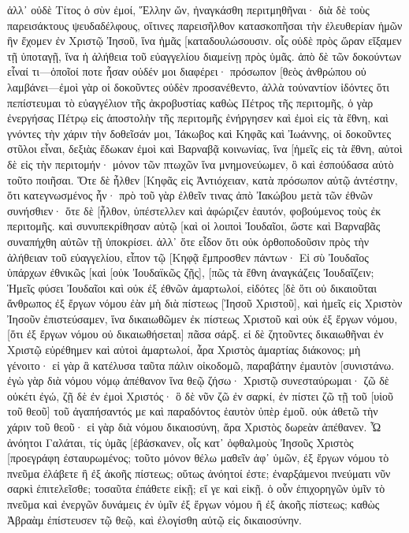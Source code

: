 ἀλλ᾽ οὐδὲ Τίτος ὁ σὺν ἐμοί, Ἕλλην ὤν, ἠναγκάσθη περιτμηθῆναι· 
διὰ δὲ τοὺς παρεισάκτους ψευδαδέλφους, οἵτινες παρεισῆλθον κατασκοπῆσαι τὴν ἐλευθερίαν ἡμῶν ἣν ἔχομεν ἐν Χριστῷ Ἰησοῦ, ἵνα ἡμᾶς [καταδουλώσουσιν. 
οἷς οὐδὲ πρὸς ὥραν εἴξαμεν τῇ ὑποταγῇ, ἵνα ἡ ἀλήθεια τοῦ εὐαγγελίου διαμείνῃ πρὸς ὑμᾶς. 
ἀπὸ δὲ τῶν δοκούντων εἶναί τι—ὁποῖοί ποτε ἦσαν οὐδέν μοι διαφέρει· πρόσωπον [θεὸς ἀνθρώπου οὐ λαμβάνει—ἐμοὶ γὰρ οἱ δοκοῦντες οὐδὲν προσανέθεντο, 
ἀλλὰ τοὐναντίον ἰδόντες ὅτι πεπίστευμαι τὸ εὐαγγέλιον τῆς ἀκροβυστίας καθὼς Πέτρος τῆς περιτομῆς, 
ὁ γὰρ ἐνεργήσας Πέτρῳ εἰς ἀποστολὴν τῆς περιτομῆς ἐνήργησεν καὶ ἐμοὶ εἰς τὰ ἔθνη, 
καὶ γνόντες τὴν χάριν τὴν δοθεῖσάν μοι, Ἰάκωβος καὶ Κηφᾶς καὶ Ἰωάννης, οἱ δοκοῦντες στῦλοι εἶναι, δεξιὰς ἔδωκαν ἐμοὶ καὶ Βαρναβᾷ κοινωνίας, ἵνα [ἡμεῖς εἰς τὰ ἔθνη, αὐτοὶ δὲ εἰς τὴν περιτομήν· 
μόνον τῶν πτωχῶν ἵνα μνημονεύωμεν, ὃ καὶ ἐσπούδασα αὐτὸ τοῦτο ποιῆσαι. 
Ὅτε δὲ ἦλθεν [Κηφᾶς εἰς Ἀντιόχειαν, κατὰ πρόσωπον αὐτῷ ἀντέστην, ὅτι κατεγνωσμένος ἦν· 
πρὸ τοῦ γὰρ ἐλθεῖν τινας ἀπὸ Ἰακώβου μετὰ τῶν ἐθνῶν συνήσθιεν· ὅτε δὲ [ἦλθον, ὑπέστελλεν καὶ ἀφώριζεν ἑαυτόν, φοβούμενος τοὺς ἐκ περιτομῆς. 
καὶ συνυπεκρίθησαν αὐτῷ [καὶ οἱ λοιποὶ Ἰουδαῖοι, ὥστε καὶ Βαρναβᾶς συναπήχθη αὐτῶν τῇ ὑποκρίσει. 
ἀλλ᾽ ὅτε εἶδον ὅτι οὐκ ὀρθοποδοῦσιν πρὸς τὴν ἀλήθειαν τοῦ εὐαγγελίου, εἶπον τῷ [Κηφᾷ ἔμπροσθεν πάντων· Εἰ σὺ Ἰουδαῖος ὑπάρχων ἐθνικῶς [καὶ [οὐκ Ἰουδαϊκῶς ζῇς], [πῶς τὰ ἔθνη ἀναγκάζεις Ἰουδαΐζειν; 
Ἡμεῖς φύσει Ἰουδαῖοι καὶ οὐκ ἐξ ἐθνῶν ἁμαρτωλοί, 
εἰδότες [δὲ ὅτι οὐ δικαιοῦται ἄνθρωπος ἐξ ἔργων νόμου ἐὰν μὴ διὰ πίστεως [Ἰησοῦ Χριστοῦ], καὶ ἡμεῖς εἰς Χριστὸν Ἰησοῦν ἐπιστεύσαμεν, ἵνα δικαιωθῶμεν ἐκ πίστεως Χριστοῦ καὶ οὐκ ἐξ ἔργων νόμου, [ὅτι ἐξ ἔργων νόμου οὐ δικαιωθήσεται] πᾶσα σάρξ. 
εἰ δὲ ζητοῦντες δικαιωθῆναι ἐν Χριστῷ εὑρέθημεν καὶ αὐτοὶ ἁμαρτωλοί, ἆρα Χριστὸς ἁμαρτίας διάκονος; μὴ γένοιτο· 
εἰ γὰρ ἃ κατέλυσα ταῦτα πάλιν οἰκοδομῶ, παραβάτην ἐμαυτὸν [συνιστάνω. 
ἐγὼ γὰρ διὰ νόμου νόμῳ ἀπέθανον ἵνα θεῷ ζήσω· Χριστῷ συνεσταύρωμαι· 
ζῶ δὲ οὐκέτι ἐγώ, ζῇ δὲ ἐν ἐμοὶ Χριστός· ὃ δὲ νῦν ζῶ ἐν σαρκί, ἐν πίστει ζῶ τῇ τοῦ [υἱοῦ τοῦ θεοῦ] τοῦ ἀγαπήσαντός με καὶ παραδόντος ἑαυτὸν ὑπὲρ ἐμοῦ. 
οὐκ ἀθετῶ τὴν χάριν τοῦ θεοῦ· εἰ γὰρ διὰ νόμου δικαιοσύνη, ἄρα Χριστὸς δωρεὰν ἀπέθανεν. 
Ὦ ἀνόητοι Γαλάται, τίς ὑμᾶς [ἐβάσκανεν, οἷς κατ᾽ ὀφθαλμοὺς Ἰησοῦς Χριστὸς [προεγράφη ἐσταυρωμένος; 
τοῦτο μόνον θέλω μαθεῖν ἀφ᾽ ὑμῶν, ἐξ ἔργων νόμου τὸ πνεῦμα ἐλάβετε ἢ ἐξ ἀκοῆς πίστεως; 
οὕτως ἀνόητοί ἐστε; ἐναρξάμενοι πνεύματι νῦν σαρκὶ ἐπιτελεῖσθε; 
τοσαῦτα ἐπάθετε εἰκῇ; εἴ γε καὶ εἰκῇ. 
ὁ οὖν ἐπιχορηγῶν ὑμῖν τὸ πνεῦμα καὶ ἐνεργῶν δυνάμεις ἐν ὑμῖν ἐξ ἔργων νόμου ἢ ἐξ ἀκοῆς πίστεως; 
καθὼς Ἀβραὰμ ἐπίστευσεν τῷ θεῷ, καὶ ἐλογίσθη αὐτῷ εἰς δικαιοσύνην. 
